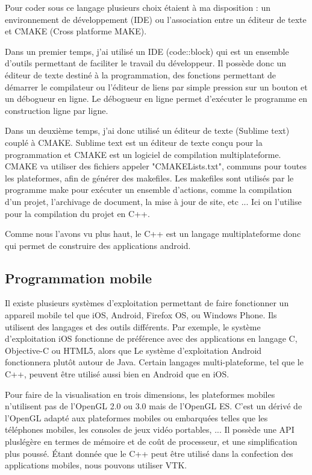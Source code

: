 \documentclass[a4paper,12pt]{article}
\begin{document}
  Pour coder sous ce langage plusieurs choix étaient à ma disposition : un environnement de développement (IDE) ou l'association entre un éditeur de texte et CMAKE (Cross platforme MAKE). 
  
  Dans un premier temps, j'ai utilisé un IDE (code::block) qui est un ensemble d'outils permettant de faciliter le travail du développeur. Il possède donc un éditeur de texte destiné à la programmation, des fonctions permettant de démarrer le compilateur ou l'éditeur de liens par simple pression sur un bouton et un débogueur en ligne. Le débogueur en ligne permet d'exécuter le programme en construction ligne par ligne. 
  
  Dans un deuxième temps, j'ai donc utilisé un éditeur de texte (Sublime text) couplé à CMAKE. Sublime text est un éditeur de texte conçu pour la programmation et CMAKE est un logiciel de compilation multiplateforme. CMAKE va utiliser des fichiers appeler "CMAKELists.txt", communs pour toutes les plateformes, afin de générer des makefiles. Les makefiles sont utilisés par le programme make pour exécuter un ensemble d'actions, comme la compilation d'un projet, l'archivage de document, la mise à jour de site, etc ... Ici on l'utilise pour la compilation du projet en C++.
  
   \vspace{0.25cm}
Comme nous l'avons vu plus haut, le C++ est un langage multiplateforme donc qui permet de construire des applications android.

	
\subsection{Programmation mobile}
	Il existe plusieurs systèmes d'exploitation permettant de faire fonctionner un appareil mobile tel que iOS, Android, Firefox OS, ou Windows Phone. Ils utilisent des langages et des outils différents. Par exemple, le système d'exploitation iOS fonctionne de préférence avec des applications en langage C, Objective-C ou HTML5, alors que Le système d'exploitation Android fonctionnera plutôt autour de Java. Certain langages multi-plateforme, tel que le C++, peuvent être utilisé aussi bien en Android que en iOS. 
	
	Pour faire de la visualisation en trois dimensions, les plateformes mobiles n'utilisent pas de l'OpenGL 2.0 ou 3.0  mais de l'OpenGL ES. C'est un dérivé de l'OpenGL adapté aux plateformes mobiles ou embarquées telles que les téléphones mobiles, les consoles de jeux vidéo portables, ... Il possède une API pluslégère en termes de mémoire et de coût de processeur, et une simplification plus poussé.
	Étant donnée que le C++ peut être utilisé dans la confection des applications mobiles, nous pouvons utiliser VTK.
		
\end{document}
